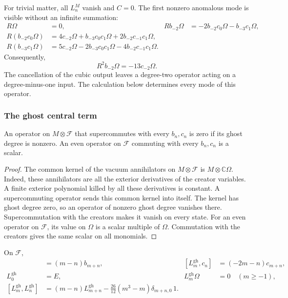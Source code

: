 For trivial matter, all $L_n^M$ vanish and $C=0$.
The first nonzero anomalous mode is visible without an infinite summation:
\begin{align*}
 R\Omega&=0, &
 Rb_{-2}\Omega&=-2b_{-2}c_0\Omega-b_{-3}c_1\Omega,\\
 R(b_{-2}c_0\Omega)&=4c_{-2}\Omega+b_{-3}c_0c_1\Omega
       +2b_{-2}c_{-1}c_1\Omega,\\
 R(b_{-3}c_1\Omega)&=5c_{-2}\Omega-2b_{-3}c_0c_1\Omega
       -4b_{-2}c_{-1}c_1\Omega.
\end{align*}
Consequently,
\begin{equation}\label{eq:vir-first-square}
 R^2b_{-2}\Omega=-13c_{-2}\Omega.
\end{equation}
The cancellation of the cubic output leaves a degree-two operator acting on a degree-minus-one input.
The calculation below determines every mode of this operator.

\subsubsection{The ghost central term}

\begin{lemma}\label{lem:vir-commutant}
An operator on $M\otimes\mathcal F$ that supercommutes with every $b_n,c_n$ is zero if its ghost degree is nonzero.
An even operator on $\mathcal F$ commuting with every $b_n,c_n$ is a scalar.
\end{lemma}

\begin{proof}
The common kernel of the vacuum annihilators on $M\otimes\mathcal F$ is $M\otimes\mathbb C\Omega$.
Indeed, these annihilators are all the exterior derivatives of the creator variables.
A finite exterior polynomial killed by all these derivatives is constant.
A supercommuting operator sends this common kernel into itself.
The kernel has ghost degree zero, so an operator of nonzero ghost degree vanishes there.
Supercommutation with the creators makes it vanish on every state.
For an even operator on $\mathcal F$, its value on $\Omega$ is a scalar multiple of $\Omega$.
Commutation with the creators gives the same scalar on all monomials.
\end{proof}

\begin{proposition}\label{prop:vir-ghost-central}
On $\mathcal F$,
\begin{align}
 [L_m^{\mathrm{gh}},b_n]&=(m-n)b_{m+n}, &
 [L_m^{\mathrm{gh}},c_n]&=(-2m-n)c_{m+n},
 \label{eq:vir-ghost-transform}\\
 L_0^{\mathrm{gh}}&=E, &
 L_m^{\mathrm{gh}}\Omega&=0\quad(m\geq-1),
 \label{eq:vir-ghost-energy}\\
 [L_m^{\mathrm{gh}},L_n^{\mathrm{gh}}]
 &=(m-n)L_{m+n}^{\mathrm{gh}}
 -\frac{26}{12}(m^3-m)\delta_{m+n,0}\,1.
 \label{eq:vir-ghost-central}
\end{align}
\end{proposition}

